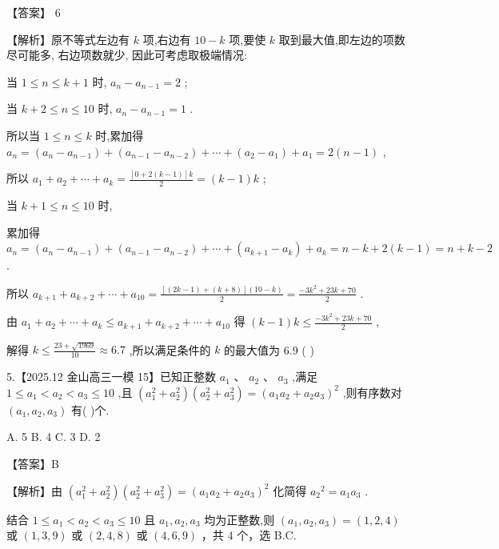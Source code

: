 \documentclass[10pt]{article}
\begin{document}
【答案】 6

【解析】原不等式左边有 \(k\) 项,右边有 \({10} - k\) 项,要使 \(k\) 取到最大值,即左边的项数尽可能多, 右边项数就少, 因此可考虑取极端情况:

当 \(1 \leq  n \leq  k + 1\) 时, \({a}_{n} - {a}_{n - 1} = 2\) ;

当 \(k + 2 \leq  n \leq  {10}\) 时, \({a}_{n} - {a}_{n - 1} = 1\) .

所以当 \(1 \leq  n \leq  k\) 时,累加得 \({a}_{n} = \left( {{a}_{n} - {a}_{n - 1}}\right)  + \left( {{a}_{n - 1} - {a}_{n - 2}}\right)  + \cdots  + \left( {{a}_{2} - {a}_{1}}\right)  + {a}_{1} = 2\left( {n - 1}\right)\) ,

所以 \({a}_{1} + {a}_{2} + \cdots  + {a}_{k} = \frac{\left\lbrack  {0 + 2\left( {k - 1}\right) }\right\rbrack  k}{2} = \left( {k - 1}\right) k\) ;

当 \(k + 1 \leq  n \leq  {10}\) 时,

累加得 \({a}_{n} = \left( {{a}_{n} - {a}_{n - 1}}\right)  + \left( {{a}_{n - 1} - {a}_{n - 2}}\right)  + \cdots  + \left( {{a}_{k + 1} - {a}_{k}}\right)  + {a}_{k} = n - k + 2\left( {k - 1}\right)  = n + k - 2\) .

所以 \({a}_{k + 1} + {a}_{k + 2} + \cdots  + {a}_{10} = \frac{\left\lbrack  {\left( {{2k} - 1}\right)  + \left( {k + 8}\right) }\right\rbrack  \left( {{10} - k}\right) }{2} = \frac{-3{k}^{2} + {23k} + {70}}{2}\) .

由 \({a}_{1} + {a}_{2} + \cdots  + {a}_{k} \leq  {a}_{k + 1} + {a}_{k + 2} + \cdots  + {a}_{10}\) 得 \(\left( {k - 1}\right) k \leq  \frac{-3{k}^{2} + {23k} + {70}}{2}\) ,

解得 \(k \leq  \frac{{23} + \sqrt{1969}}{10} \approx  {6.7}\) ,所以满足条件的 \(k\) 的最大值为 6.9 (   )

5.【2025.12 金山高三一模 15】已知正整数 \({a}_{1}\text{ 、 }{a}_{2}\text{ 、 }{a}_{3}\) ,满足 \(1 \leq  {a}_{1} < {a}_{2} < {a}_{3} \leq  {10}\) ,且 \(\left( {{a}_{1}^{2} + {a}_{2}^{2}}\right) \left( {{a}_{2}^{2} + {a}_{3}^{2}}\right)  = {\left( {a}_{1}{a}_{2} + {a}_{2}{a}_{3}\right) }^{2}\) ,则有序数对 \(\left( {{a}_{1},{a}_{2},{a}_{3}}\right)\) 有(   )个.

A. 5 B. 4 C. 3 D. 2

【答案】B

【解析】由 \(\left( {{a}_{1}^{2} + {a}_{2}^{2}}\right) \left( {{a}_{2}^{2} + {a}_{3}^{2}}\right)  = {\left( {a}_{1}{a}_{2} + {a}_{2}{a}_{3}\right) }^{2}\) 化简得 \({a}_{2}{}^{2} = {a}_{1}{a}_{3}\) .

结合 \(1 \leq  {a}_{1} < {a}_{2} < {a}_{3} \leq  {10}\) 且 \({a}_{1},{a}_{2},{a}_{3}\) 均为正整数,则 \(\left( {{a}_{1},{a}_{2},{a}_{3}}\right)  = \left( {1,2,4}\right)\) 或 \(\left( {1,3,9}\right)\) 或 \(\left( {2,4,8}\right)\) 或 \(\left( {4,6,9}\right)\) ，共 4 个，选 B.C.
\end{document}
